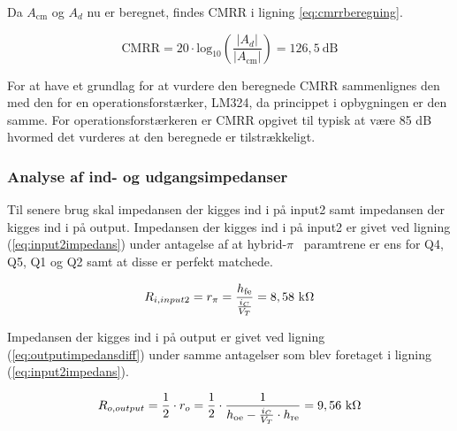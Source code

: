 Da $A_\mathrm{cm}$ og $A_d$ nu er beregnet, findes CMRR i ligning \ref{eq:cmrrberegning}.

\begin{equation}
\mathrm{CMRR}=20 \cdot \mathrm{log}_{10} \left( \frac{|A_d|}{|A_\mathrm{cm}|}\right)=126,5~\mathrm{dB}
\label{eq:cmrrberegning}
\end{equation}

For at have et grundlag for at vurdere den beregnede CMRR sammenlignes den med den for en operationsforstærker, LM324, da princippet i opbygningen er den samme. For operationsforstærkeren er CMRR opgivet til typisk at være 85 dB hvormed det vurderes at den beregnede er tilstrækkeligt. 

\subsubsection*{Analyse af ind- og udgangsimpedanser}
Til senere brug skal impedansen der kigges ind i på input2 samt impedansen der kigges ind i på output. 
Impedansen der kigges ind i på input2 er givet ved ligning (\ref{eq:input2impedans}) \cite{sedra-smith-4} %
under antagelse af at hybrid-$\pi$~ paramtrene er ens for Q4, Q5, Q1 og Q2 samt at disse er perfekt matchede. 

\begin{equation}
R_{i, input2}= r_\pi = \frac{h_\mathrm{fe}}{\frac{i_C}{V_T}} = 8,58~\mathrm{k}\ohm
\label{eq:input2impedans}
\end{equation}

Impedansen der kigges ind i på output er givet ved ligning (\ref{eq:outputimpedansdiff}) \cite{sedra-smith-5} %
under samme antagelser som blev foretaget i ligning (\ref{eq:input2impedans}).

\begin{equation}
R_{o, output} = \frac{1}{2} \cdot r_o = \frac{1}{2} \cdot \frac{1}{h_\mathrm{oe} - \frac{i_C}{V_T} \cdot h_\mathrm{re}} = 9,56~\mathrm{k}\ohm
\label{eq:outputimpedansdiff}
\end{equation}
